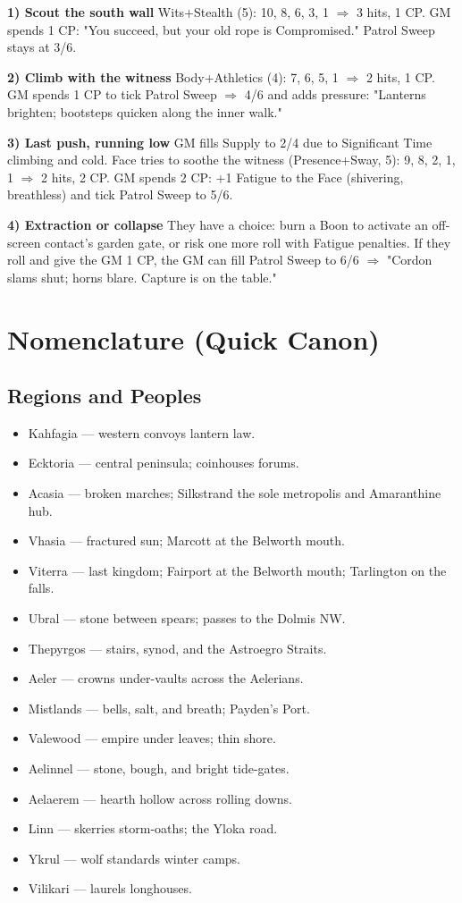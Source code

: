 \textbf{1) Scout the south wall} Wits+Stealth (5): 10, 8, 6, 3, 1 $\Rightarrow$ 3 hits, 1 CP. GM spends 1 CP: "You succeed, but your old rope is Compromised." Patrol Sweep stays at 3/6.

\textbf{2) Climb with the witness} Body+Athletics (4): 7, 6, 5, 1 $\Rightarrow$ 2 hits, 1 CP. GM spends 1 CP to tick Patrol Sweep $\Rightarrow$ 4/6 and adds pressure: "Lanterns brighten; bootsteps quicken along the inner walk."

\textbf{3) Last push, running low} GM fills Supply to 2/4 due to Significant Time climbing and cold. Face tries to soothe the witness (Presence+Sway, 5): 9, 8, 2, 1, 1 $\Rightarrow$ 2 hits, 2 CP. GM spends 2 CP: +1 Fatigue to the Face (shivering, breathless) and tick Patrol Sweep to 5/6.

\textbf{4) Extraction or collapse} They have a choice: burn a Boon to activate an off-screen contact's garden gate, or risk one more roll with Fatigue penalties. If they roll and give the GM 1 CP, the GM can fill Patrol Sweep to 6/6 $\Rightarrow$ "Cordon slams shut; horns blare. Capture is on the table."

\section{Nomenclature (Quick Canon)}

\subsection{Regions and Peoples}
\begin{itemize}
\item Kahfagia --- western convoys lantern law.
\item Ecktoria --- central peninsula; coinhouses forums.
\item Acasia --- broken marches; Silkstrand the sole metropolis and Amaranthine hub.
\item Vhasia --- fractured sun; Marcott at the Belworth mouth.
\item Viterra --- last kingdom; Fairport at the Belworth mouth; Tarlington on the falls.
\item Ubral --- stone between spears; passes to the Dolmis NW.
\item Thepyrgos --- stairs, synod, and the Astroegro Straits.
\item Aeler --- crowns under-vaults across the Aelerians.
\item Mistlands --- bells, salt, and breath; Payden's Port.
\item Valewood --- empire under leaves; thin shore.
\item Aelinnel --- stone, bough, and bright tide-gates.
\item Aelaerem --- hearth hollow across rolling downs.
\item Linn --- skerries storm-oaths; the Yloka road.
\item Ykrul --- wolf standards winter camps.
\item Vilikari --- laurels longhouses.
\end{itemize}

